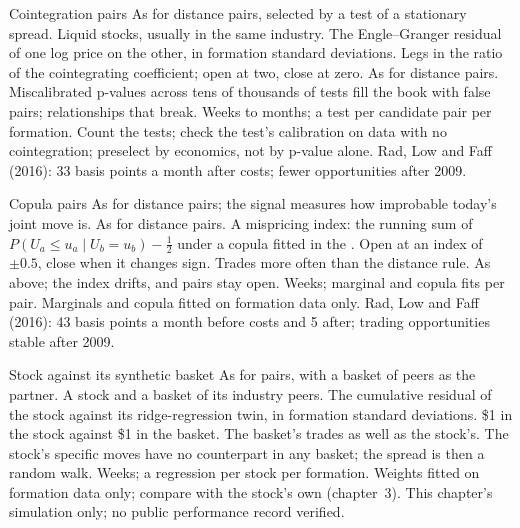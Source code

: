 \begin{strategyfile}{Cointegration pairs}\label{strat:s1:pairs-and-baskets:coint}
 As for distance pairs, selected by a test of a stationary spread.
 Liquid stocks, usually in the same industry.
 The Engle--Granger residual of one log price on the other, in formation standard deviations.
 Legs in the ratio of the cointegrating coefficient; open at two, close at zero.
 As for distance pairs.
 Miscalibrated p-values across tens of thousands of tests fill the book with false pairs; relationships that break.
 Weeks to months; a test per candidate pair per formation.
 Count the tests; check the test's calibration on data with no cointegration; preselect by economics, not by p-value alone.
 Rad, Low and Faff (2016): 33 basis points a month after costs; fewer opportunities after 2009.
\end{strategyfile}

\begin{strategyfile}{Copula pairs}\label{strat:s1:pairs-and-baskets:copula}
 As for distance pairs; the signal measures how improbable today's joint move is.
 As for distance pairs.
 A mispricing index: the running sum of $P(U_a \le u_a \mid U_b = u_b) - \tfrac12$ under a copula fitted in the .
 Open at an index of $\pm 0.5$, close when it changes sign.
 Trades more often than the distance rule.
 As above; the index drifts, and pairs stay open.
 Weeks; marginal and copula fits per pair.
 Marginals and copula fitted on formation data only.
 Rad, Low and Faff (2016): 43 basis points a month before costs and 5 after; trading opportunities stable after 2009.
\end{strategyfile}

\begin{strategyfile}{Stock against its synthetic basket}\label{strat:s1:pairs-and-baskets:basket}
 As for pairs, with a basket of peers as the partner.
 A stock and a basket of its industry peers.
 The cumulative residual of the stock against its ridge-regression twin, in formation standard deviations.
 \$1 in the stock against \$1 in the basket.
 The basket's trades as well as the stock's.
 The stock's specific moves have no counterpart in any basket; the spread is then a random walk.
 Weeks; a regression per stock per formation.
 Weights fitted on formation data only; compare with the stock's own  (chapter~3).
 This chapter's simulation only; no public performance record verified.
\end{strategyfile}

